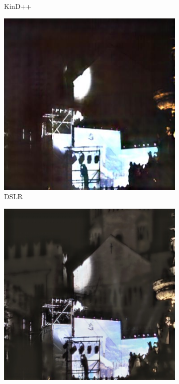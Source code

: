 \documentclass[a4paper]{ctexart}
\begin{document}
\begin{figure}[htb]
\begin{subfigure}{0.19\textwidth}
				\captionsetup{font=scriptsize}
				\caption{KinD++}
				\label{fig: KinD++2}	
			\end{subfigure}
			\begin{subfigure}{0.19\textwidth}
				\includegraphics[width=\linewidth]{picture/LLIE/Experiment/DSLR2}
				\captionsetup{font=scriptsize}
				\caption{DSLR}
				\label{fig: DSLR2}	
			\end{subfigure}
			\begin{subfigure}{0.19\textwidth}
				\includegraphics[width=\linewidth]{picture/LLIE/Experiment/TBEFN2}

\end{subfigure}
\end{figure}
\end{document}
